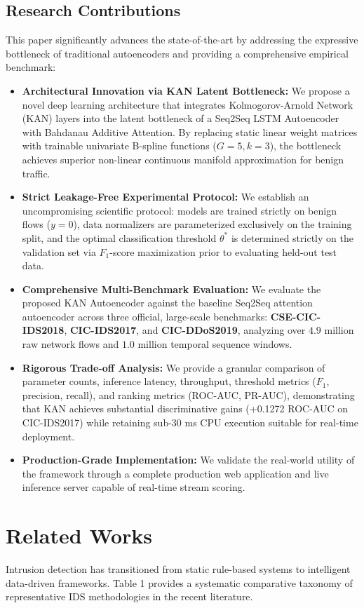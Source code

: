 \documentclass[twocolumn]{article}
\begin{document}
\subsection{Research Contributions}
This paper significantly advances the state-of-the-art by addressing the expressive bottleneck of traditional autoencoders and providing a comprehensive empirical benchmark:
\begin{itemize}
    \item \textbf{Architectural Innovation via KAN Latent Bottleneck:} We propose a novel deep learning architecture that integrates Kolmogorov-Arnold Network (KAN) layers into the latent bottleneck of a Seq2Seq LSTM Autoencoder with Bahdanau Additive Attention. By replacing static linear weight matrices with trainable univariate B-spline functions ($G=5, k=3$), the bottleneck achieves superior non-linear continuous manifold approximation for benign traffic.
    \item \textbf{Strict Leakage-Free Experimental Protocol:} We establish an uncompromising scientific protocol: models are trained strictly on benign flows ($y=0$), data normalizers are parameterized exclusively on the training split, and the optimal classification threshold $\theta^*$ is determined strictly on the validation set via $F_1$-score maximization prior to evaluating held-out test data.
    \item \textbf{Comprehensive Multi-Benchmark Evaluation:} We evaluate the proposed KAN Autoencoder against the baseline Seq2Seq attention autoencoder across three official, large-scale benchmarks: \textbf{CSE-CIC-IDS2018}, \textbf{CIC-IDS2017}, and \textbf{CIC-DDoS2019}, analyzing over $4.9$ million raw network flows and $1.0$ million temporal sequence windows.
    \item \textbf{Rigorous Trade-off Analysis:} We provide a granular comparison of parameter counts, inference latency, throughput, threshold metrics ($F_1$, precision, recall), and ranking metrics (ROC-AUC, PR-AUC), demonstrating that KAN achieves substantial discriminative gains (+0.1272 ROC-AUC on CIC-IDS2017) while retaining sub-30 ms CPU execution suitable for real-time deployment.
    \item \textbf{Production-Grade Implementation:} We validate the real-world utility of the framework through a complete production web application and live inference server capable of real-time stream scoring.
\end{itemize}

\section{Related Works}
Intrusion detection has transitioned from static rule-based systems to intelligent data-driven frameworks. Table 1 provides a systematic comparative taxonomy of representative IDS methodologies in the recent literature.
\end{document}
